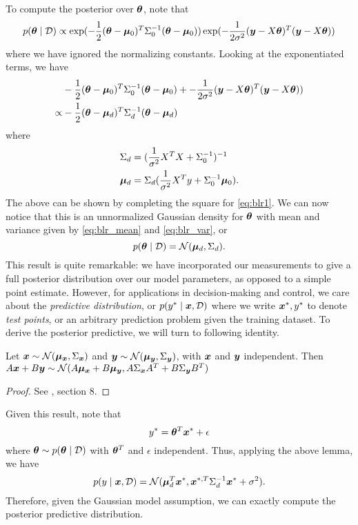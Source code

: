 To compute the posterior over $\bm{\theta}$, note that 
\begin{equation}
p(\bm{\theta} \mid \mathcal{D}) \propto \exp(-\frac{1}{2}(\bm{\theta} - \bm{\mu}_0)^T \Sigma_0^{-1} (\bm{\theta} - \bm{\mu}_0)) \exp(-\frac{1}{2\sigma^2} (\bm{y} - X \bm{\theta})^T (\bm{y} - X \bm{\theta}) )
\end{equation}
where we have ignored the normalizing constants. Looking at the exponentiated terms, we have 
\begin{align}
    & -\frac{1}{2}(\bm{\theta} - \bm{\mu}_0)^T \Sigma_0^{-1} (\bm{\theta} - \bm{\mu}_0) + -\frac{1}{2\sigma^2} (\bm{y} - X \bm{\theta})^T (\bm{y} - X \bm{\theta}) ) \label{eq:blr1}\\
    \propto & -\frac{1}{2} (\bm{\theta} - \bm{\mu}_{d})^T \Sigma_{d}^{-1} (\bm{\theta} - \bm{\mu}_{d})
\end{align}
where
\begin{align}
    \Sigma_{d} &= (\frac{1}{\sigma^2} X^T X + \Sigma_0^{-1})^{-1} \label{eq:blr_var}\\
    \bm{\mu}_{d} &= \Sigma_{d} (\frac{1}{\sigma^2} X^T y + \Sigma_0^{-1} \bm{\mu}_0) \label{eq:blr_mean}.
\end{align}
The above can be shown by completing the square for \eqref{eq:blr1}. We can now notice that this is an unnormalized Gaussian density for $\bm{\theta}$ with mean and variance given by \eqref{eq:blr_mean} and \eqref{eq:blr_var}, or
\begin{equation}
    p(\bm{\theta} \mid \mathcal{D}) = \mathcal{N}(\bm{\mu}_{d}, \Sigma_{d}).
\end{equation}
This result is quite remarkable: we have incorporated our measurements to give a full posterior distribution over our model parameters, as opposed to a simple point estimate. However, for applications in decision-making and control, we care about the \textit{predictive distribution}, or $p(y^* \mid \bm{x}, \mathcal{D})$ where we write $\bm{x}^*, y^*$ to denote \textit{test points}, or an arbitrary prediction problem given the training dataset. To derive the posterior predictive, we will turn to following identity.
\begin{lemma}
Let $\bm{x} \sim \mathcal{N}(\bm{\mu}_{\bm{x}}, \Sigma_{\bm{x}})$ and $\bm{y} \sim \mathcal{N}(\bm{\mu}_{\bm{y}}, \Sigma_{\bm{y}})$, with $\bm{x}$ and $\bm{y}$ independent. Then $A \bm{x} + B \bm{y} \sim \mathcal{N} (A \bm{\mu}_{\bm{x}} + B \bm{\mu}_{\bm{y}}, A \Sigma_{\bm{x}} A^T + B \Sigma_{\bm{y}} B^T)$
\end{lemma}
\begin{proof}
See \cite{petersenmatrix}, section 8.
\end{proof}
Given this result, note that 
\begin{equation}
    y^* = \bm{\theta}^T \bm{x}^* + \epsilon
\end{equation}
where $\bm{\theta} \sim p(\bm{\theta}\mid \mathcal{D})$ with $\bm{\theta}^T$ and $\epsilon$ independent. Thus, applying the above lemma, we have
\begin{equation}
    p(y\mid \bm{x}, \mathcal{D}) = \mathcal{N}(\bm{\mu}_{d}^T \bm{x}^*, \bm{x}^{*,T} \Sigma^{-1}_{d} \bm{x}^* + \sigma^2).
\end{equation}
Therefore, given the Gaussian model assumption, we can exactly compute the posterior predictive distribution.


